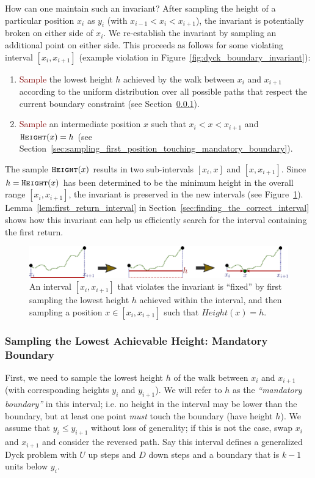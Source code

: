 How can one maintain such an invariant?
After sampling the height of a particular position $x_i$ as $y_i$ (with $x_{i-1} < x_i < x_{i+1}$),
the invariant is potentially broken on either side of $x_i$.
We re-establish the invariant by sampling an additional point on either side.
This proceeds as follows for some violating interval $[x_i, x_{i+1}]$ (example violation in Figure~\ref{fig:dyck_boundary_invariant}):
\begin{enumerate}
    \item \textcolor{Maroon}{Sample} the lowest height $h$ achieved by the walk between $x_i$ and $x_{i+1}$ according to
    the uniform distribution over all possible paths that respect the current boundary constraint
    (see Section~\ref{sec:sampling_the_lowest_achievable_height}).
    \item \textcolor{Maroon}{Sample} an intermediate position $x$ such that $x_i < x < x_{i+1}$ and $\texttt{\textsc{Height}}(x) = h$
    (see Section~\ref{sec:sampling_first_position_touching_mandatory_boundary}).
\end{enumerate}
The sample $\texttt{\textsc{Height}}(x)$ results in two sub-intervals $[x_i, x]$ and $[x, x_{i+1}]$.
Since $h = \texttt{\textsc{Height}}(x)$ has been determined to be the minimum height in the overall range $[x_i, x_{i+1}]$,
the invariant is preserved in the new intervals (see Figure~\ref{fig:dyck_invariant_preserve}).
Lemma~\ref{lem:first_return_interval} in Section~\ref{sec:finding_the_correct_interval}
shows how this invariant can help us efficiently search for the interval containing the first return.
\begin{figure}[htpb]
    \centering
    \includegraphics[width=\textwidth]{images/dyck_invariant_preserve.pdf}
    \caption{An interval $[x_i, x_{i+1}]$ that violates the invariant is ``fixed'' by first sampling the lowest height $h$ achieved within the interval,
    and then sampling a position $x\in [x_i, x_{i+1}]$ such that $Height(x) = h$.}
    \label{fig:dyck_invariant_preserve}
\end{figure}


\subsubsection{Sampling the Lowest Achievable Height: Mandatory Boundary}
\label{sec:sampling_the_lowest_achievable_height}
First, we need to sample the lowest height $h$ of the walk between $x_i$ and $x_{i+1}$ (with corresponding heights $y_i$ and $y_{i+1}$).
We will refer to $h$ as the \emph{``mandatory boundary''} in this interval;
i.e. no height in the interval may be lower than the boundary, but at least one point \emph{must} touch the boundary (have height $h$).
We assume that $y_i\le y_{i+1}$ without loss of generality; if this is not the case, swap $x_i$ and $x_{i+1}$ and consider the reversed path.
Say this interval defines a generalized Dyck problem with $U$ up steps and $D$ down steps and a boundary that is $k-1$ units below $y_i$.


